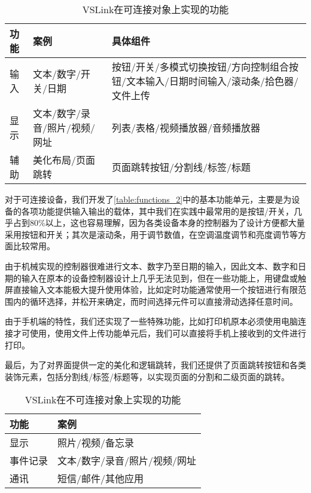 \begin{table}[htbp]
	\caption{VSLink在可连接对象上实现的功能}  \label{table:functions_2} 
	\begin{center}  
		\begin{tabular}{|m{1cm}<{\centering}|m{6cm}<{\centering}|m{8cm}<{\centering}|}  
			\hline  
			\textbf{功能} & \textbf{案例} &\textbf{具体组件}\\ \hline  
			输入 & 文本/数字/开关/日期 & 按钮/开关/多模式切换按钮/方向控制组合按钮/文本输入/日期时间输入/滚动条/拾色器/文件上传 \\ \hline 
			显示 & 文本/数字/录音/照片/视频/网址 & 列表/表格/视频播放器/音频播放器  \\ \hline
			辅助 & 美化布局/页面跳转 & 页面跳转按钮/分割线/标签/标题 \\ \hline
		\end{tabular}  
	\end{center}  
\end{table}

对于可连接设备，我们开发了\autoref{table:functions_2}中的基本功能单元，主要是为设备的各项功能提供输入输出的载体，其中我们在实践中最常用的是按钮/开关，几乎占到80\%以上，这也容易理解，因为各类设备本身的控制器为了设计方便都大量采用按钮和开关；其次是滚动条，用于调节数值，在空调温度调节和亮度调节等方面比较常用。

由于机械实现的控制器很难进行文本、数字乃至日期的输入，因此文本、数字和日期的输入在原本的设备控制器设计上几乎无法见到，但在一些功能上，用键盘或触屏直接输入文本能极大提升使用体验，比如定时功能通常使用一个按钮进行有限范围内的循环选择，并松开来确定，而时间选择元件可以直接滑动选择任意时间。

由于手机端的特性，我们还实现了一些特殊功能，比如打印机原本必须使用电脑连接才可使用，使用文件上传功能单元后，我们可以直接将手机上接收到的文件进行打印。

最后，为了对界面提供一定的美化和逻辑跳转，我们还提供了页面跳转按钮和各类装饰元素，包括分割线/标签/标题等，以实现页面的分割和二级页面的跳转。

\begin{table}[htbp]
	\caption{VSLink在不可连接对象上实现的功能}  \label{table:functions}  
	\begin{center}  
		\begin{tabular}{|l|l|}  
			\hline  
			\textbf{功能} & \textbf{案例} \\ \hline  
			显示 & 照片/视频/备忘录   \\ \hline 
			事件记录 & 文本/数字/录音/照片/视频/网址   \\ \hline 
			通讯 & 短信/邮件/其他应用   \\ \hline  
		\end{tabular}  
	\end{center}  
\end{table}

